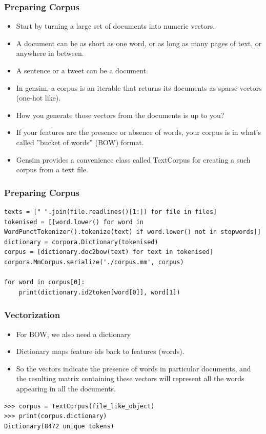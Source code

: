 \begin{frame}[fragile]\frametitle{Preparing Corpus}
  \begin{itemize}
  	\item Start by turning a large set of documents into numeric vectors. 
	\item A document can be as short as one word, or as long as many pages of text, or anywhere in between.
	\item A sentence or a tweet can be a document.
	\item In gensim, a corpus is an iterable that returns its documents as sparse vectors (one-hot like).
	\item How you generate those vectors from the documents is up to you?
	\item If your features are the presence or absence of words, your corpus is in what's called ''bucket of words'' (BOW) format. 			
	\item Gensim provides a convenience class called TextCorpus for creating a such corpus from a text file.

  \end{itemize}
\end{frame}

\begin{frame}[fragile]\frametitle{Preparing Corpus}
	\begin{lstlisting}
texts = [" ".join(file.readlines()[1:]) for file in files]
tokenised = [[word.lower() for word in WordPunctTokenizer().tokenize(text) if word.lower() not in stopwords]]
dictionary = corpora.Dictionary(tokenised)
corpus = [dictionary.doc2bow(text) for text in tokenised]
corpora.MmCorpus.serialize('./corpus.mm', corpus)

for word in corpus[0]:
	print(dictionary.id2token[word[0]], word[1])
\end{lstlisting}
\end{frame}



\begin{frame}[fragile]\frametitle{Vectorization}
  \begin{itemize}
  	\item For BOW, we also need a dictionary
	\item Dictionary maps feature ids back to features (words). 
	\item So the vectors indicate the presence of words in particular documents, and the resulting matrix containing these vectors will represent all the words appearing in all the documents. 
  \end{itemize}
\begin{lstlisting}
>>> corpus = TextCorpus(file_like_object)
>>> print(corpus.dictionary)
Dictionary(8472 unique tokens)
\end{lstlisting}
\end{frame}


